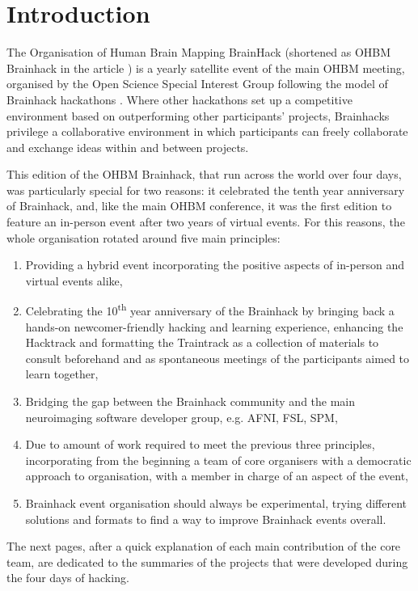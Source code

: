 \documentclass[10pt,a4paper,twocolumns]{proc}
\begin{document}
\section*{Introduction}

The Organisation of Human Brain Mapping BrainHack (shortened as OHBM
Brainhack in the article ) is a yearly satellite event of the main OHBM
meeting, organised by the Open Science Special Interest Group following
the model of Brainhack hackathons \parencite{Gau2021}.
Where other hackathons set up a competitive environment based on
outperforming other participants' projects, Brainhacks privilege a
collaborative environment in which participants can freely collaborate
and exchange ideas within and between projects.

This edition of the OHBM Brainhack, that run across the world over four
days, was particularly special for two reasons: it celebrated the tenth
year anniversary of Brainhack, and, like the main OHBM conference, it
was the first edition to feature an in-person event after two years of
virtual events. For this reasons, the whole organisation rotated around
five main principles:

\begin{enumerate}
\tightlist
\item
  Providing a hybrid event incorporating the positive aspects of
  in-person and virtual events alike,
\item
  Celebrating the 10\textsuperscript{th} year anniversary of the
  Brainhack by bringing back a hands-on newcomer-friendly hacking and
  learning experience, enhancing the Hacktrack and formatting the
  Traintrack as a collection of materials to consult beforehand and as
  spontaneous meetings of the participants aimed to learn together,
\item
  Bridging the gap between the Brainhack community and the main
  neuroimaging software developer group, e.g. AFNI, FSL, SPM,
\item
  Due to amount of work required to meet the previous three principles,
  incorporating from the beginning a team of core organisers with a
  democratic approach to organisation, with a member in charge of an
  aspect of the event,
\item
  Brainhack event organisation should always be experimental, trying
  different solutions and formats to find a way to improve Brainhack
  events overall. 
\end{enumerate}

The next pages, after a quick explanation of each main contribution of
the core team, are dedicated to the summaries of the projects that were
developed during the four days of hacking.
\end{document}
